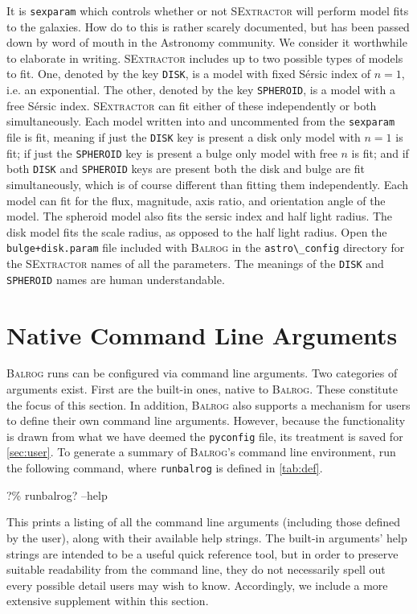 \documentclass[12pt]{book}
\newcommand{\codett}[1]{\lstinline{#1}}
\newcommand{\pyconfig}{\codett{pyconfig}}
\newcommand{\balrog}{\textsc{Balrog}}
\newcommand{\sex}{\textsc{SExtractor}}
\newcommand{\bcmd}{\% runbalrog}
\newcommand{\sersic}{S\'{e}rsic}
\begin{document}
It is \codett{sexparam} which controls whether or not \sex{} will perform model fits to the galaxies. 
How do to this is rather scarely documented, but has been passed down by word of mouth in the Astronomy community. 
We consider it worthwhile to elaborate in writing.
\sex{} includes up to two possible types of models to fit.
One, denoted by the key \codett{DISK}, is a model with fixed \sersic{} index of $n=1$,
i.e. an exponential.
The other, denoted by the key \codett{SPHEROID}, is a model with a free \sersic{} index.
\sex{} can fit either of these independently or both simultaneously.
Each model written into and uncommented from the \codett{sexparam} file is fit,
meaning if just the \codett{DISK} key is present a disk only model with $n=1$ is fit;
if just the \codett{SPHEROID} key is present a bulge only model with free $n$ is fit;
and if both \codett{DISK} and \codett{SPHEROID} keys are present both the
disk and bulge are fit simultaneously, which is of course different than fitting them independently.
Each model can fit for the flux, magnitude, axis ratio, and orientation angle of the model.
The spheroid model also fits the sersic index and half light radius.
The disk model fits the scale radius, as opposed to the half light radius.
Open the \codett{bulge+disk.param} file included with \balrog{} in the \codett{astro\_config} directory
for the \sex{} names of all the parameters.
The meanings of the \codett{DISK} and \codett{SPHEROID} names are human understandable.


\chapter{Native Command Line Arguments}
\label{sec:cmdline}

\balrog{} runs can be configured via command line arguments.
Two categories of arguments exist. 
First are the built-in ones, native to \balrog{}.
These constitute the focus of this section.
In addition, \balrog{} also supports a mechanism for users to define their own command line arguments.
However, because the functionality is drawn from what we have deemed the \pyconfig{} file,
its treatment is saved for \autoref{sec:user}.
To generate a summary of \balrog{}'s command line environment, run the following command,
where \codett{runbalrog} is defined in \autoref{tab:def}.

\begin{cmdline}
?\bcmd? --help
\end{cmdline}
This prints a listing of all the command line arguments (including those defined by the user), 
along with their available help strings.
The built-in arguments' help strings are intended to be a useful quick reference tool,
but in order to preserve suitable readability from the command line, 
they do not necessarily spell out every possible detail users may wish to know.
Accordingly, we include a more extensive supplement within this section.
\end{document}
